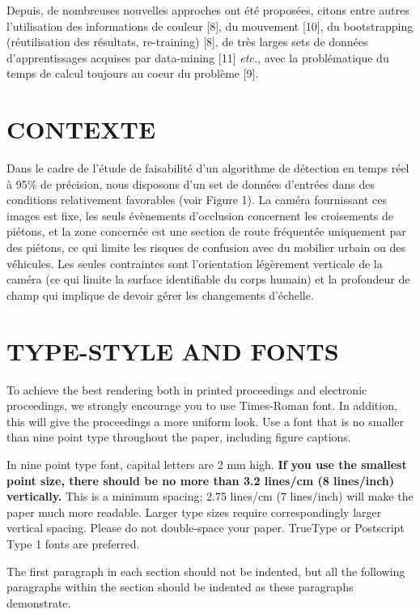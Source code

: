 \documentclass{article}
\begin{document}
	Depuis, de nombreuses nouvelles approches ont été proposées, citons entre autres l'utilisation des informations de couleur [8], du mouvement [10], du bootstrapping (réutilisation des résultats, re-training) [8], de très larges sets de données d'apprentissages acquises par data-mining [11]  \textit{etc.}, avec la problématique du temps de calcul toujours au coeur du problème [9].


\section{CONTEXTE}
\label{sec:pagestyle}

	Dans le cadre de l'étude de faisabilité d'un algorithme de détection en temps réel à 95\% de précision, nous disposons d'un set de données d'entrées dans des conditions relativement favorables (voir Figure 1). La caméra fournissant ces images est fixe, les seuls évènements d'occlusion concernent les croisements de piétons, et la zone concernée est une section de route fréquentée uniquement par des piétons, ce qui limite les risques de confusion avec du mobilier urbain ou des véhicules. Les seules contraintes sont l'orientation légèrement verticale de la caméra (ce qui limite la surface identifiable du corps humain) et la profondeur de champ qui implique de devoir gérer les changements d'échelle.

\section{TYPE-STYLE AND FONTS}
\label{sec:typestyle}

To achieve the best rendering both in printed proceedings and electronic proceedings, we
strongly encourage you to use Times-Roman font.  In addition, this will give
the proceedings a more uniform look.  Use a font that is no smaller than nine
point type throughout the paper, including figure captions.

In nine point type font, capital letters are 2 mm high.  {\bf If you use the
smallest point size, there should be no more than 3.2 lines/cm (8 lines/inch)
vertically.}  This is a minimum spacing; 2.75 lines/cm (7 lines/inch) will make
the paper much more readable.  Larger type sizes require correspondingly larger
vertical spacing.  Please do not double-space your paper.  TrueType or
Postscript Type 1 fonts are preferred.

The first paragraph in each section should not be indented, but all the
following paragraphs within the section should be indented as these paragraphs
demonstrate.
\end{document}
